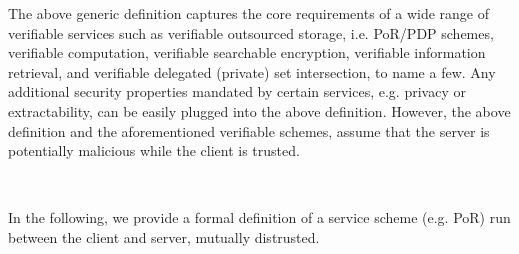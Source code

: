 The above generic definition captures the core requirements of a wide range of verifiable services such as verifiable outsourced storage, i.e. PoR/PDP schemes, verifiable computation, verifiable searchable encryption, verifiable information retrieval, and verifiable delegated (private) set intersection, to name a few. Any additional security properties mandated by certain services, e.g.  privacy or extractability, can be easily plugged into the above definition.  However,  the above definition and the aforementioned verifiable schemes,  assume that the server is potentially malicious while the client is trusted. 



\



In the following, we provide a formal definition of  a service scheme (e.g. PoR)  run between the client and server, mutually distrusted. 

